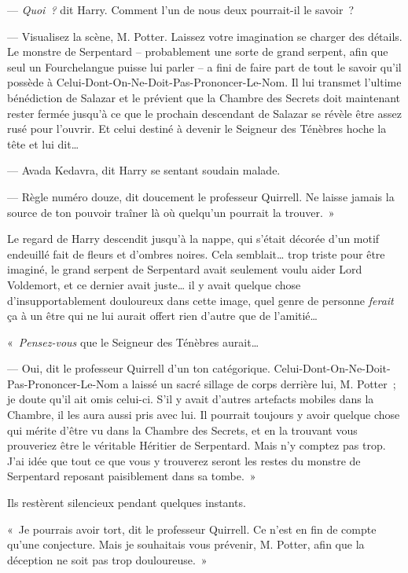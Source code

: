 --- \emph{Quoi~?} dit Harry.
Comment l'un de nous deux pourrait-il le savoir~?

--- Visualisez la scène, M. Potter.
Laissez votre imagination se charger des détails.
Le monstre de Serpentard -- probablement une sorte de grand serpent, afin que seul un Fourchelangue puisse lui parler -- a fini de faire part de tout le savoir qu'il possède à Celui-Dont-On-Ne-Doit-Pas-Prononcer-Le-Nom.
Il lui transmet l'ultime bénédiction de Salazar et le prévient que la Chambre des Secrets doit maintenant rester fermée jusqu'à ce que le prochain descendant de Salazar se révèle être assez rusé pour l'ouvrir.
Et celui destiné à devenir le Seigneur des Ténèbres hoche la tête et lui dit…

--- Avada Kedavra, dit Harry se sentant soudain malade.

--- Règle numéro douze, dit doucement le professeur Quirrell.
Ne laisse jamais la source de ton pouvoir traîner là où quelqu'un pourrait la trouver.~»

Le regard de Harry descendit jusqu'à la nappe, qui s'était décorée d'un motif endeuillé fait de fleurs et d'ombres noires.
Cela semblait… trop triste pour être imaginé, le grand serpent de Serpentard avait seulement voulu aider Lord Voldemort, et ce dernier avait juste… il y avait quelque chose d'insupportablement douloureux dans cette image, quel genre de personne \emph{ferait} ça à un être qui ne lui aurait offert rien d'autre que de l'amitié…

«~\emph{Pensez-vous} que le Seigneur des Ténèbres aurait…

--- Oui, dit le professeur Quirrell d'un ton catégorique.
Celui-Dont-On-Ne-Doit-Pas-Prononcer-Le-Nom a laissé un sacré sillage de corps derrière lui, M. Potter~; je doute qu'il ait omis celui-ci.
S'il y avait d'autres artefacts mobiles dans la Chambre, il les aura aussi pris avec lui.
Il pourrait toujours y avoir quelque chose qui mérite d'être vu dans la Chambre des Secrets, et en la trouvant vous prouveriez être le véritable Héritier de Serpentard.
Mais n'y comptez pas trop.
J'ai idée que tout ce que vous y trouverez seront les restes du monstre de Serpentard reposant paisiblement dans sa tombe.~»

Ils restèrent silencieux pendant quelques instants.

«~Je pourrais avoir tort, dit le professeur Quirrell.
Ce n'est en fin de compte qu'une conjecture.
Mais je souhaitais vous prévenir, M. Potter, afin que la déception ne soit pas trop douloureuse.~»

